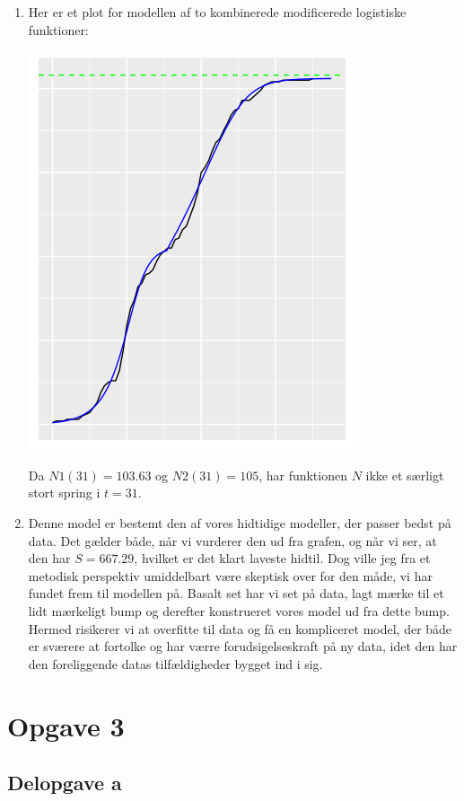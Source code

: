 \documentclass[12pt]{article}
\begin{document}
\begin{enumerate}
\item Her er et plot for modellen af to kombinerede modificerede logistiske funktioner:
\begin{center}
\includegraphics[scale=0.6]{q2p12.png}
\end{center}
Da $N1(31)=103.63$ og $N2(31)=105$, har funktionen $N$ ikke et særligt stort spring i $t=31$.
\item Denne model er bestemt den af vores hidtidige modeller, der passer bedst på data. Det gælder både, når vi vurderer den ud fra grafen, og når vi ser, at den har $S=667.29$, hvilket er det klart laveste hidtil. Dog ville jeg fra et metodisk perspektiv umiddelbart være skeptisk over for den måde, vi har fundet frem til modellen på. Basalt set har vi set på data, lagt mærke til et lidt mærkeligt bump og derefter konstrueret vores model ud fra dette bump. Hermed risikerer vi at overfitte til data og få en kompliceret model, der både er sværere at fortolke og har værre forudsigelseskraft på ny data, idet den har den foreliggende datas tilfældigheder bygget ind i sig.
\end{enumerate}

\section{Opgave 3}

\subsection{Delopgave a}
\end{document}
